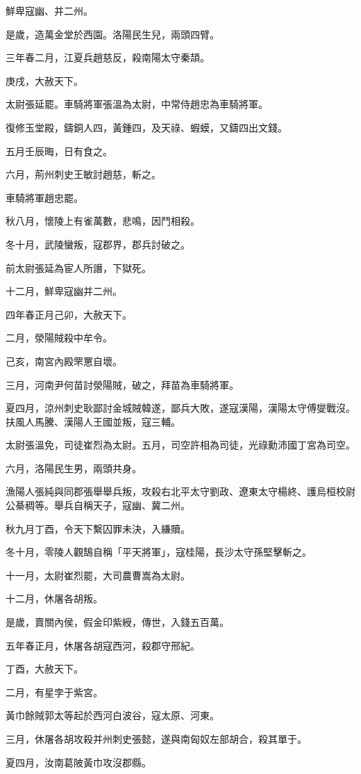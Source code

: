 \begin{pinyinscope}
鮮卑寇幽、并二州。

是歲，造萬金堂於西園。洛陽民生兒，兩頭四臂。

三年春二月，江夏兵趙慈反，殺南陽太守秦頡。

庚戌，大赦天下。

太尉張延罷。車騎將軍張溫為太尉，中常侍趙忠為車騎將軍。

復修玉堂殿，鑄銅人四，黃鍾四，及天祿、蝦蟆，又鑄四出文錢。

五月壬辰晦，日有食之。

六月，荊州刺史王敏討趙慈，斬之。

車騎將軍趙忠罷。

秋八月，懷陵上有雀萬數，悲鳴，因鬥相殺。

冬十月，武陵蠻叛，寇郡界，郡兵討破之。

前太尉張延為宦人所譖，下獄死。

十二月，鮮卑寇幽并二州。

四年春正月己卯，大赦天下。

二月，滎陽賊殺中牟令。

己亥，南宮內殿罘罳自壞。

三月，河南尹何苗討滎陽賊，破之，拜苗為車騎將軍。

夏四月，涼州刺史耿鄙討金城賊韓遂，鄙兵大敗，遂寇漢陽，漢陽太守傅燮戰沒。扶風人馬騰、漢陽人王國並叛，寇三輔。

太尉張溫免，司徒崔烈為太尉。五月，司空許相為司徒，光祿勳沛國丁宮為司空。

六月，洛陽民生男，兩頭共身。

漁陽人張純與同郡張舉舉兵叛，攻殺右北平太守劉政、遼東太守楊終、護烏桓校尉公綦稠等。舉兵自稱天子，寇幽、冀二州。

秋九月丁酉，令天下繫囚罪未決，入縑贖。

冬十月，零陵人觀鵠自稱「平天將軍」，寇桂陽，長沙太守孫堅擊斬之。

十一月，太尉崔烈罷，大司農曹嵩為太尉。

十二月，休屠各胡叛。

是歲，賣關內侯，假金印紫綬，傳世，入錢五百萬。

五年春正月，休屠各胡寇西河，殺郡守邢紀。

丁酉，大赦天下。

二月，有星孛于紫宮。

黃巾餘賊郭太等起於西河白波谷，寇太原、河東。

三月，休屠各胡攻殺并州刺史張懿，遂與南匈奴左部胡合，殺其單于。

夏四月，汝南葛陂黃巾攻沒郡縣。


\end{pinyinscope}

